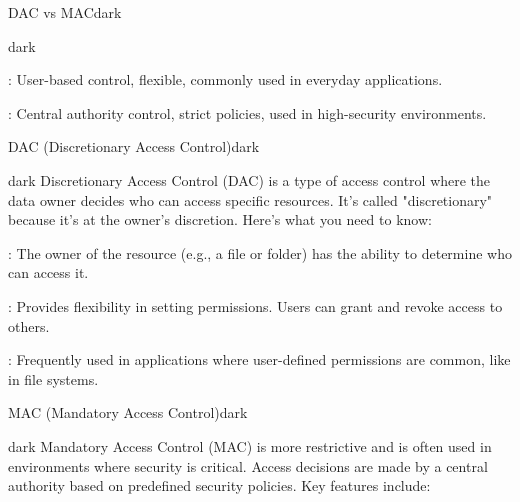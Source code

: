 \label{DAC vs MAC}
\begin{baseBoxThree}{DAC vs MAC}{dark}
    \bigskip
    \begin{baseBoxThree}{}{dark}
        \begin{posnexItemize}
            \item[\sA] : User-based control, flexible, commonly used in everyday applications.
            \item[\sA] : Central authority control, strict policies, used in high-security environments.
        \end{posnexItemize}
    \end{baseBoxThree}
    \bigskip
    \label{DAC (Discretionary Access Control)}
    \begin{baseBoxThree}{DAC (Discretionary Access Control)}{dark}
        \smallskip
        \begin{baseBoxThree}{}{dark}
            \smallskip
            Discretionary Access Control (DAC) is a type of access control where the data owner decides who can access specific resources. It's called "discretionary" because it's at the owner's discretion. Here's what you need to know:
            \smallskip
        \end{baseBoxThree}
        \smallskip
        \begin{posnexItemize}
            \item[\sA] : The owner of the resource (e.g., a file or folder) has the ability to determine who can access it.
            \item[\sA] : Provides flexibility in setting permissions. Users can grant and revoke access to others.
            \item[\sA] : Frequently used in applications where user-defined permissions are common, like in file systems.
        \end{posnexItemize}
    \end{baseBoxThree}
    \smallskip
    \label{MAC (Mandatory Access Control)}
    \begin{baseBoxThree}{MAC (Mandatory Access Control)}{dark}
        \smallskip
        \begin{baseBoxThree}{}{dark}
            \smallskip
            Mandatory Access Control (MAC) is more restrictive and is often used in environments where security is critical. Access decisions are made by a central authority based on predefined security policies. Key features include:

\end{baseBoxThree}
\end{baseBoxThree}
\end{baseBoxThree}
